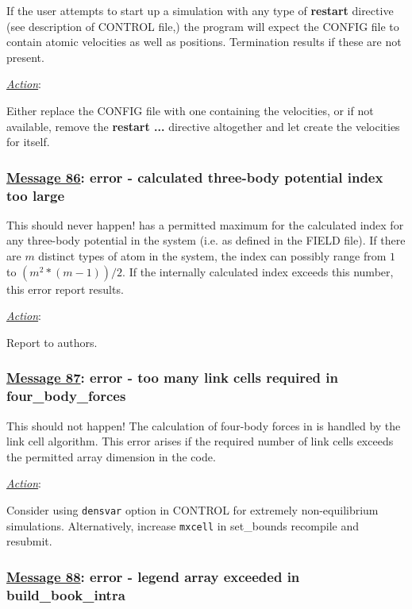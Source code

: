 If the user attempts to start up a \D simulation with any type of
{\bf restart} directive (see description of CONTROL file,) the
program will expect the CONFIG file to contain atomic velocities
as well as positions.  Termination results if these are not
present.

\noindent \underline{\em Action}:

Either replace the CONFIG file with one containing the velocities,
or if not available, remove the {\bf restart ...} directive
altogether and let \D create the velocities for itself.

\subsubsection*{\underline{Message 86}: error - calculated three-body potential index too large}

This should never happen!  \D has a permitted maximum for the
calculated index for any three-body
potential in the system (i.e. as defined in the FIELD file).  If
there are $m$ distinct types of atom in the system, the index can
possibly range from $1$ to $(m^{2}*(m-1))/2$.  If the internally
calculated index exceeds this number, this error report results.

\noindent \underline{\em Action}:

Report to authors.

\subsubsection*{\underline{Message 87}: error - too many link cells required in four\_body\_forces}

This should not happen!  The calculation of four-body
forces in \D is handled by the link
cell algorithm.  This error arises if the required number of link
cells exceeds the permitted array dimension in the code.

\noindent \underline{\em Action}:

Consider using {\tt densvar} option in CONTROL for extremely
non-equilibrium simulations.  Alternatively, increase {\tt mxcell}
in {\sc set\_bounds} recompile and resubmit.

\subsubsection*{\underline{Message 88}: error - legend array exceeded in build\_book\_intra}


